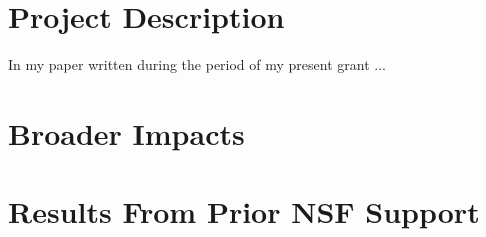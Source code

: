 

\section{Project Description}


In my paper \cite{paper01} written during the period of my present
grant ... 


\section{Broader Impacts}

\section{Results From Prior NSF Support}


